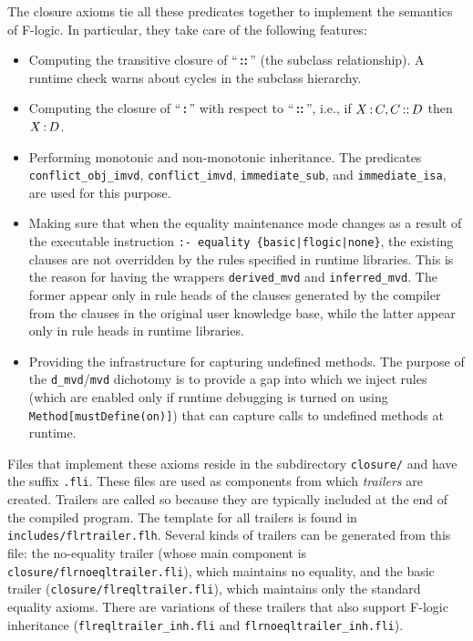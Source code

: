 \documentclass[11pt]{article}
\newcommand{\ERGO}{\mbox{\smaller{\ensuremath{\cal{E}}\smaller{{\sc{RGO}}}}}\xspace}
\newcommand{\FLSYSTEM}{\ERGO}
\newcommand{\isa}{\,{\bf{:}}\,}
\newcommand{\subcl}{\,{\bf{::}}\,}
\newcommand{\fl}{\mbox{F-logic}\xspace}
\begin{document}
The closure axioms tie all these predicates together to implement the
semantics of \fl. In particular, they take care of the following features:
\begin{itemize}
\item Computing the transitive closure of ``\subcl'' (the subclass
  relationship).  A runtime check warns about cycles in the subclass
  hierarchy.
\item Computing the closure of ``\isa'' with respect to ``\subcl'', i.e.,
  if $X\isa C, C\subcl D$ then $X\isa D$.
\item Performing monotonic and non-monotonic inheritance. The predicates
  {\tt conflict\_obj\_imvd}, {\tt conflict\_imvd}, {\tt immediate\_sub},
  and {\tt immediate\_isa}, are used for this purpose.
\item Making sure that when the equality maintenance mode changes as a
  result of the executable instruction {\tt :- equality
  \{basic|flogic|none\}}, the existing clauses are not overridden by the
  rules specified in \FLSYSTEM runtime libraries. This is the reason for
  having the wrappers {\tt derived\_mvd} and {\tt inferred\_mvd}. The former
  appear only in rule heads of the clauses generated by the compiler
  from the clauses in the original user knowledge base, while the latter appear only in
  rule heads in runtime libraries.
\item Providing the infrastructure for capturing undefined methods.
  The purpose of the {\tt d\_mvd}/{\tt mvd} dichotomy is to provide a gap
  into which we inject rules
  (which are enabled only if runtime debugging is turned on using
  {\tt Method[mustDefine(on)]}) that can capture calls to undefined
  methods at runtime.
\end{itemize}
Files that implement these axioms reside in the subdirectory
\texttt{closure/} and have the suffix {\tt .fli}.  These files are used as
components from which \FLSYSTEM \emph{trailers} are created.  Trailers are
called so because they are typically included at the end of the compiled
program. The template for all trailers is found in
{\tt includes/flrtrailer.flh}.  Several kinds of trailers can be generated from
this file: the no-equality trailer (whose main component is {\tt
  closure/flrnoeqltrailer.fli}), which maintains no equality, and the basic
trailer ({\tt closure/flreqltrailer.fli}), which maintains only the
standard equality axioms.
There are variations of these trailers that also support \fl inheritance
({\tt flreqltrailer\_inh.fli}  and {\tt flrnoeqltrailer\_inh.fli}).
\end{document}
